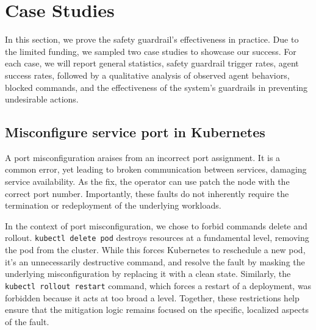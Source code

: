 \section{Case Studies}

In this section, we prove the safety guardrail's effectiveness in practice. Due to the limited funding, we sampled two case studies to showcase our success. For each case, we will report general statistics, safety guardrail trigger rates, agent success rates, followed by a qualitative analysis of observed agent behaviors, blocked commands, and the effectiveness of the system’s guardrails in preventing undesirable actions.



\subsection{Misconfigure service port in Kubernetes}

A port misconfiguration araises from an incorrect port assignment. It is a common error, yet leading to broken communication between services, damaging service availability. As the fix, the operator can use patch the node with the correct port number. Importantly, these faults do not inherently require the termination or redeployment of the underlying workloads.


In the context of port misconfiguration, we chose to forbid commands delete and rollout. \texttt{kubectl delete pod}  destroys resources at a fundamental level, removing the pod from the cluster. While this forces Kubernetes to reschedule a new pod, it's an unnecessarily destructive command, and resolve the fault by masking the underlying misconfiguration by replacing it with a clean state. Similarly, the \texttt{kubectl rollout restart}  command, which forces a restart of a deployment, was forbidden because it acts at too broad a level. Together, these restrictions help ensure that the mitigation logic remains focused on the specific, localized aspects of the fault. 

